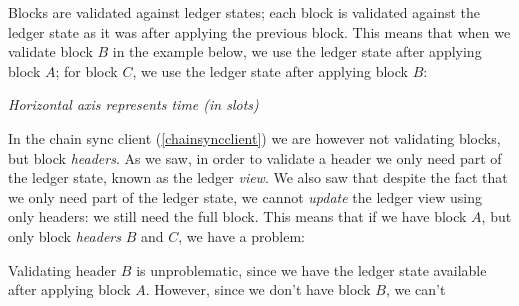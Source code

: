 Blocks are validated against ledger states; each block is validated against the
ledger state as it was after applying the previous block. This means that when
we validate block $B$ in the example below, we use the ledger state after
applying block $A$; for block $C$, we use the ledger state after applying block
$B$:
%
\begin{center}
\qquad
\begin{minipage}{0.25\textwidth}
\emph{Horizontal axis represents time (in slots)}
\end{minipage}
\end{center}
%
In the chain sync client (\cref{chainsyncclient}) we are however not validating
blocks, but block \emph{headers}. As we saw, in order to validate a header we
only need part of the ledger state, known as the ledger \emph{view}. We also saw
that  despite the fact that we only need part of the ledger state, we cannot
\emph{update} the ledger view using only headers: we still need the full block.
This means that if we have block $A$, but only block \emph{headers} $B$ and $C$,
we have a problem:
%
\begin{center}
\end{center}
%
Validating header $B$ is unproblematic, since we have the ledger state available
after applying block $A$. However, since we don't have block $B$, we can't
